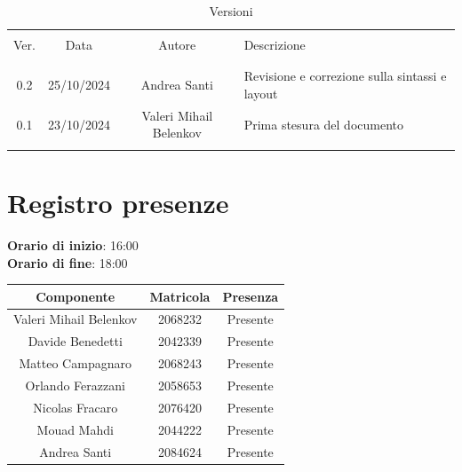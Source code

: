 \documentclass[italian, 12pt]{article}
\begin{document}
\pagestyle{mystyle}


\begin{table}[!h]
	\caption{Versioni}
	\begin{center}
		\begin{tabular}{ c c c p{9cm}}
			\hline \\[-2ex]
			Ver. & Data & Autore & Descrizione \\
			\\[-2ex] \hline \\[-1.5ex]
            0.2 & 25/10/2024 & Andrea Santi & Revisione e correzione sulla sintassi e layout \\
			0.1 & 23/10/2024 & Valeri Mihail Belenkov& Prima stesura del documento\\
			\\[-1.5ex] \hline
		\end{tabular}
	\end{center}
\end{table}


\tableofcontents
\newpage


\section{Registro presenze}

\textbf{Orario di inizio}: 16:00\\
\textbf{Orario di fine}: 18:00\\


\begin{flushleft}
	\begin{table}[!h]
	\begin{tabular}{ |c|c|c| } 
		\hline
		\textbf{Componente} & \textbf{Matricola} & \textbf{Presenza} \\
  \hline 
		Valeri Mihail Belenkov & 2068232 & Presente \\
		Davide Benedetti 	& 2042339 & Presente \\
		Matteo Campagnaro	& 2068243 & Presente \\
		Orlando Ferazzani 	& 2058653 & Presente \\
		Nicolas Fracaro 	& 2076420 & Presente \\
		Mouad Mahdi		    & 2044222 & Presente \\ 
		Andrea Santi 	    & 2084624 & Presente \\
		\hline
	\end{tabular}
	\end{table}
	\end{flushleft}
\end{document}
